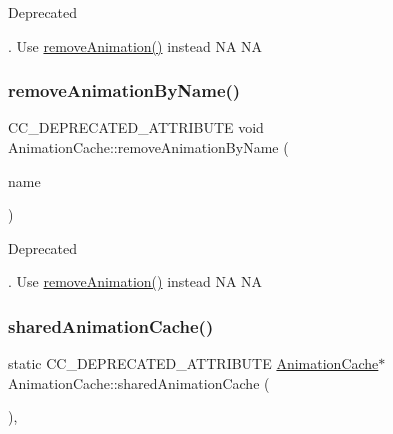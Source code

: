 \begin{DoxyRefDesc}{Deprecated}
\item[\hyperlink{deprecated__deprecated000021}{Deprecated}]. Use \hyperlink{classAnimationCache_a7e3f77ac879a17a8418cdb80aebb2ca7}{remove\+Animation()} instead  NA  NA \end{DoxyRefDesc}
\mbox{\label{classAnimationCache_a67e8c52d54b5615c58c896eaa617a716}} 
\subsubsection{\texorpdfstring{remove\+Animation\+By\+Name()}{removeAnimationByName()}\hspace{0.1cm}{\footnotesize\ttfamily [2/2]}}
{\footnotesize\ttfamily C\+C\+\_\+\+D\+E\+P\+R\+E\+C\+A\+T\+E\+D\+\_\+\+A\+T\+T\+R\+I\+B\+U\+TE void Animation\+Cache\+::remove\+Animation\+By\+Name (\begin{DoxyParamCaption}\item[{const std\+::string \&}]{name }\end{DoxyParamCaption})\hspace{0.3cm}{\ttfamily [inline]}}

\begin{DoxyRefDesc}{Deprecated}
\item[\hyperlink{deprecated__deprecated000251}{Deprecated}]. Use \hyperlink{classAnimationCache_a7e3f77ac879a17a8418cdb80aebb2ca7}{remove\+Animation()} instead  NA  NA \end{DoxyRefDesc}
\mbox{\label{classAnimationCache_ad8f32209ad141f9244ec14ba960579f0}} 
\subsubsection{\texorpdfstring{shared\+Animation\+Cache()}{sharedAnimationCache()}\hspace{0.1cm}{\footnotesize\ttfamily [1/2]}}
{\footnotesize\ttfamily static C\+C\+\_\+\+D\+E\+P\+R\+E\+C\+A\+T\+E\+D\+\_\+\+A\+T\+T\+R\+I\+B\+U\+TE \hyperlink{classAnimationCache}{Animation\+Cache}$\ast$ Animation\+Cache\+::shared\+Animation\+Cache (\begin{DoxyParamCaption}{ }\end{DoxyParamCaption})\hspace{0.3cm}{\ttfamily [inline]}, {\ttfamily [static]}}

